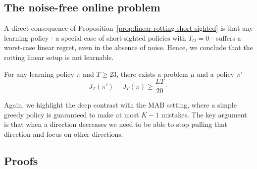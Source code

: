 \subsection{The noise-free online problem}
A direct consequence of Proposition~\ref{prop:linear-rotting-short-sighted} is that any learning policy - a special case of short-sighted policies with $T_O =0$ - suffers a worst-case linear regret, even in the absence of noise. Hence, we conclude that the rotting linear setup is not learnable. 
\begin{corollary}
For any learning policy $\pi$ and $T\geq 23$, there exists a problem $\mu$ and a policy $\pi'$
\[
J_T(\pi') - J_T(\pi)  \geq  \frac{LT}{20}\cdot
\]
\end{corollary}

Again, we highlight the deep contrast with the MAB setting, where a simple greedy policy is guaranteed to make at most $K-1$ mistakes. The key argument is that when a direction decreases we need to be able to stop pulling that direction and focus on other directions.  

\subsection{Proofs}
\label{ss:linear-rotting-proofs}
\label{ss:linear-rotting-proof}

